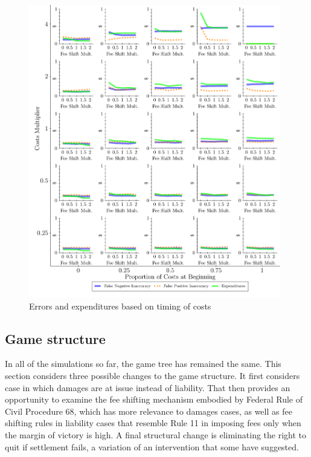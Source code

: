 \documentclass{article}
\begin{document}
\begin{figure}
\begin{minipage}{0.48\textwidth}
        \includegraphics[width=0.98\textwidth, scale=0.70, trim={0in 0in 0in 0in}, clip]{../Figures/Accuracy and Expenditures Varying Proportion of Costs at Beginning} %
        \caption{Errors and expenditures based on timing of costs}
		\label{fig:accexp_timing}
    \end{minipage}
\end{figure}

\subsection{Game structure}

In all of the simulations so far, the game tree has remained the same. This section considers three possible changes to the game structure. It first considers case in which damages are at issue instead of liability. That then provides an opportunity to examine the fee shifting mechanism embodied by Federal Rule of Civil Procedure 68, which has more relevance to damages cases, as well as fee shifting rules in liability cases that resemble Rule 11 in imposing fees only when the margin of victory is high. A final structural change is eliminating the right to quit if settlement fails, a variation of an intervention that some have suggested.
\end{document}
